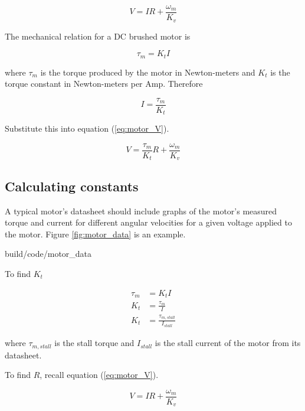 \begin{equation}
  V = IR + \frac{\omega_m}{K_v} \label{eq:motor_V}
\end{equation}

The mechanical relation for a DC brushed motor is

\begin{equation}
  \tau_m = K_t I \label{eq:motor_tau_m}
\end{equation}

where $\tau_m$ is the torque produced by the motor in Newton-meters and $K_t$ is
the torque constant in Newton-meters per Amp. Therefore

\begin{equation*}
  I = \frac{\tau_m}{K_t}
\end{equation*}

Substitute this into equation (\ref{eq:motor_V}).

\begin{equation}
  V = \frac{\tau_m}{K_t} R + \frac{\omega_m}{K_v} \label{eq:motor_tau_V}
\end{equation}

\subsection{Calculating constants}

A typical motor's datasheet should include graphs of the motor's measured torque
and current for different angular velocities for a given voltage applied to the
motor. Figure \ref{fig:motor_data} is an example.

\begin{svg}{build/code/motor_data}
  \caption{Example motor datasheet for 775pro}
  \label{fig:motor_data}
\end{svg}

To find $K_t$

\begin{align}
  \tau_m &= K_t I \nonumber \\
  K_t &= \frac{\tau_m}{I} \nonumber \\
  K_t &= \frac{\tau_{m,stall}}{I_{stall}}
\end{align}

where $\tau_{m,stall}$ is the stall torque and $I_{stall}$ is the stall current
of the motor from its datasheet.

To find $R$, recall equation (\ref{eq:motor_V}).

\begin{equation*}
  V = IR + \frac{\omega_m}{K_v}
\end{equation*}

